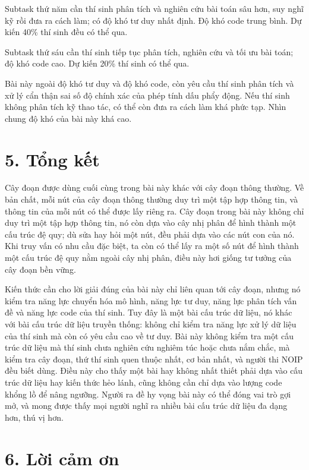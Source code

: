 \documentclass[11pt]{article}
\begin{document}
Subtask thứ năm cần thí sinh phân tích và nghiên cứu bài toán sâu hơn, suy
nghĩ kỹ rồi đưa ra cách làm; có độ khó tư duy nhất định. Độ khó code trung
bình. Dự kiến 40\% thí sinh đều có thể qua.

Subtask thứ sáu cần thí sinh tiếp tục phân tích, nghiên cứu và tối ưu bài
toán; độ khó code cao. Dự kiến 20\% thí sinh có thể qua.

Bài này ngoài độ khó tư duy và độ khó code, còn yêu cầu thí sinh phân tích và
xử lý cẩn thận sai số độ chính xác của phép tính dấu phẩy động. Nếu thí sinh
không phân tích kỹ thao tác, có thể còn đưa ra cách làm khá phức tạp. Nhìn
chung độ khó của bài này khá cao.

\section*{5. Tổng kết}

Cây đoạn được dùng cuối cùng trong bài này khác với cây đoạn thông thường. Về
bản chất, mỗi nút của cây đoạn thông thường duy trì một tập hợp thông tin, và
thông tin của mỗi nút có thể được lấy riêng ra. Cây đoạn trong bài này không
chỉ duy trì một tập hợp thông tin, nó còn dựa vào cây nhị phân để hình thành
một cấu trúc đệ quy; dù sửa hay hỏi một nút, đều phải dựa vào các nút con của
nó. Khi truy vấn có nhu cầu đặc biệt, ta còn có thể lấy ra một số nút để hình
thành một cấu trúc đệ quy nằm ngoài cây nhị phân, điều này hơi giống tư tưởng
của cây đoạn bền vững.

Kiến thức cần cho lời giải đúng của bài này chỉ liên quan tới cây đoạn, nhưng
nó kiểm tra năng lực chuyển hóa mô hình, năng lực tư duy, năng lực phân tích
vấn đề và năng lực code của thí sinh. Tuy đây là một bài cấu trúc dữ liệu,
nó khác với bài cấu trúc dữ liệu truyền thống: không chỉ kiểm tra năng lực xử
lý dữ liệu của thí sinh mà còn có yêu cầu cao về tư duy. Bài này không kiểm
tra một cấu trúc dữ liệu mà thí sinh chưa nghiên cứu nghiêm túc hoặc chưa nắm
chắc, mà kiểm tra cây đoạn, thứ thí sinh quen thuộc nhất, cơ bản nhất, và
người thi NOIP đều biết dùng. Điều này cho thấy một bài hay không nhất thiết
phải dựa vào cấu trúc dữ liệu hay kiến thức hẻo lánh, cũng không cần chỉ dựa
vào lượng code khổng lồ để nâng ngưỡng. Người ra đề hy vọng bài này có thể
đóng vai trò gợi mở, và mong được thấy mọi người nghĩ ra nhiều bài cấu trúc
dữ liệu đa dạng hơn, thú vị hơn.

\section*{6. Lời cảm ơn}
\end{document}
